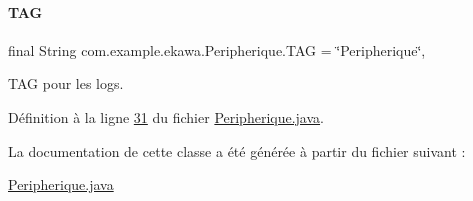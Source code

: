 \paragraph{\texorpdfstring{T\+AG}{TAG}}
{\footnotesize\ttfamily final String com.\+example.\+ekawa.\+Peripherique.\+T\+AG = \char`\"{}Peripherique\char`\"{}\hspace{0.3cm}{\ttfamily [static]}, {\ttfamily [private]}}



T\+AG pour les logs. 



Définition à la ligne \hyperlink{_peripherique_8java_source_l00031}{31} du fichier \hyperlink{_peripherique_8java_source}{Peripherique.\+java}.



La documentation de cette classe a été générée à partir du fichier suivant \+:\begin{DoxyCompactItemize}
\item 
\hyperlink{_peripherique_8java}{Peripherique.\+java}\end{DoxyCompactItemize}
